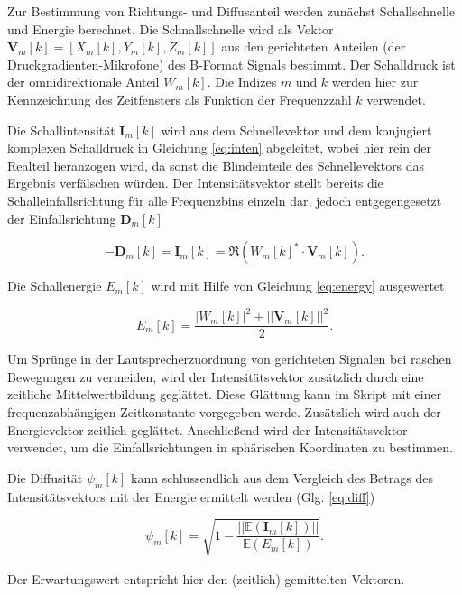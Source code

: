 Zur Bestimmung von Richtungs- und Diffusanteil werden zunächst Schallschnelle und Energie berechnet. Die Schnallschnelle wird als Vektor $\textbf{V}_{m}[k] = [X_{m}[k], Y_{m}[k], Z_{m}[k]]$ aus den gerichteten Anteilen (der Druckgradienten-Mikrofone) des B-Format Signals bestimmt. Der Schalldruck ist der omnidirektionale Anteil $W_{m}[k]$. Die Indizes $m$ und $k$ werden hier zur Kennzeichnung des Zeitfensters als Funktion der Frequenzzahl $k$ verwendet.

Die Schallintensität $\textbf{I}_{m}[k]$ wird aus dem Schnellevektor und dem konjugiert komplexen Schalldruck in Gleichung \ref{eq:inten} abgeleitet, wobei hier rein der Realteil heranzogen wird, da sonst die Blindeinteile des Schnellevektors das Ergebnis verfälschen würden. Der Intensitätsvektor stellt bereits die Schalleinfallsrichtung für alle Frequenzbins einzeln dar, jedoch entgegengesetzt der Einfallsrichtung $\textbf{D}_{m}[k]$

\begin{equation}
    -\textbf{D}_{m}[k] = \textbf{I}_{m}[k] = \Re(W_{m}[k]^{*} \cdot \textbf{V}_{m}[k]) .
    \label{eq:inten}
\end{equation}

Die Schallenergie $E_{m}[k]$ wird mit Hilfe von Gleichung \ref{eq:energy} ausgewertet

\begin{equation}
    E_{m}[k] = \frac{|W_{m}[k]|^2+||\textbf{V}_{m}[k]||^2}{2} .
    \label{eq:energy}
\end{equation}

Um Sprünge in der Lautsprecherzuordnung von gerichteten Signalen bei raschen Bewegungen zu vermeiden, wird der Intensitätsvektor zusätzlich durch eine zeitliche Mittelwertbildung geglättet. Diese Glättung kann im Skript mit einer frequenzabhängigen Zeitkonstante vorgegeben werde. Zusätzlich wird auch der Energievektor zeitlich geglättet. Anschließend wird der Intensitätsvektor verwendet, um die Einfallsrichtungen in sphärischen Koordinaten zu bestimmen.

Die Diffusität $\psi_{m}[k]$ kann schlussendlich aus dem Vergleich des Betrags des Intensitätsvektors mit der Energie ermittelt werden (Glg. \ref{eq:diff})

\begin{equation}
    \psi_{m}[k] = \sqrt{1 - \frac{||\mathbb{E}(\textbf{I}_{m}[k])||}{\mathbb{E}(E_{m}[k])}} .
    \label{eq:diff}
\end{equation}

 Der Erwartungswert entspricht hier den (zeitlich) gemittelten Vektoren.

